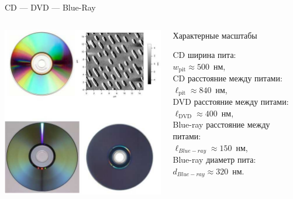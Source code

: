 \documentclass[9pt, compress, xcolor=table]{beamer}
\begin{document}
\begin{frame}{CD --- DVD --- Blue-Ray}
\begin{columns}[c]

\column{1.7in}
\begin{center}
\includegraphics[scale=1.0]{CD-DVD-BlueRay-short}
\end{center}

\column{2.1in}
\begin{block}{Характерные масштабы}

CD ширина пита: \\
$w_{\text{pit}}\approx500$~нм, \\
CD расстояние между питами: \\
$\ell_{\text{pit}}\approx840$~нм, \\
DVD расстояние между питами: \\
$\ell_{\text{DVD}}\approx400$~нм, \\
Blue-ray расстояние между питами: \\
$\ell_{Blue-ray}\approx150$~нм, \\
Blue-ray диаметр пита: \\
$d_{Blue-ray}\approx320$~нм.
\end{block}

\end{columns}
\end{frame}
\end{document}
